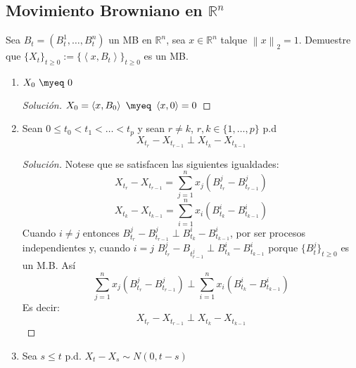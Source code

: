 \documentclass[11pt,notitlepage]{article}
\newenvironment{solucion}
  {\begin{proof}[Solución]}
  {\end{proof}}
\begin{document}
\subsection{Movimiento Browniano en \(\mathbb{R}^n\)} Sea \(B_t = (B_{t}^{1},\hdots,B_{t}^{n})\) un MB en \(\mathbb{R}^n\), sea \(x\in\mathbb{R}^n\) talque 
\(\left \| x \right \|_2 = 1\). Demuestre que \(\{X_t\}_{t\geq0}:= \{\left \langle x,B_t \right \rangle\}_{t\geq0}\) es un 
MB.
\begin{enumerate}
    \item \(X_0 \ \myeq \ 0\) 
    \begin{solucion}
     \(X_0 = \left \langle x,B_0 \right \rangle \ \myeq \ \left \langle x,0 \right \rangle = 0\) 
    \end{solucion}
    \item Sean \(0\leq t_0 < t_1 < \hdots < t_p\) y sean \(r \neq  k\), \(r,k \in \{1,\hdots,p\}\) p.d 
    \[X_{t_r} - X_{t_{r-1}} \mathbb{\perp} X_{t_k} - X_{t_{k-1}} \]
    \begin{solucion}
       Notese que se satisfacen las siguientes igualdades: 
       \begin{equation*}
        X_{t_{r}} - X_{t_{r-1}}  = \sum_{j=1}^{n}x_j\left(B_{t_r}^{j} - B_{t_{r-1}}^{j} \right)
       \end{equation*}
       \begin{equation*}
         X_{t_{k}} - X_{t_{k-1}}  = \sum_{i=1}^{n}x_i\left(B_{t_k}^{i} - B_{t_{k-1}}^{i} \right)   
       \end{equation*}
     Cuando \(i\neq j\) entonces \(B_{t_r}^{j} - B_{t_{r-1}}^{j} \perp B_{t_k}^{i} - B_{t_{k-1}}^{i}\), por ser procesos independientes y, cuando \(i = j\)
      \(B_{t_r}^{j} - B_t_{r-1}^{j} \perp B_{t_k}^{i} - B_{t_{k-1}}^{i}\) porque \(\{B_{t}^{j}\}_{t\geq0}\) es un M.B. 
      Así 
      \[\sum_{j=1}^{n}x_j\left(B_{t_r}^{j} - B_{t_{r-1}}^{j} \right) \perp \sum_{i=1}^{n}x_i\left(B_{t_k}^{i} - B_{t_{k-1}}^{i} \right) \]
      Es decir: 
       \[X_{t_r} - X_{t_{r-1}} \mathbb{\perp} X_{t_k} - X_{t_{k-1}} \]
    \end{solucion}
    \item Sea \(s \leq t\) p.d. \(X_t - X_s \sim N(0,t-s)\)
   

\end{enumerate}
\end{document}
